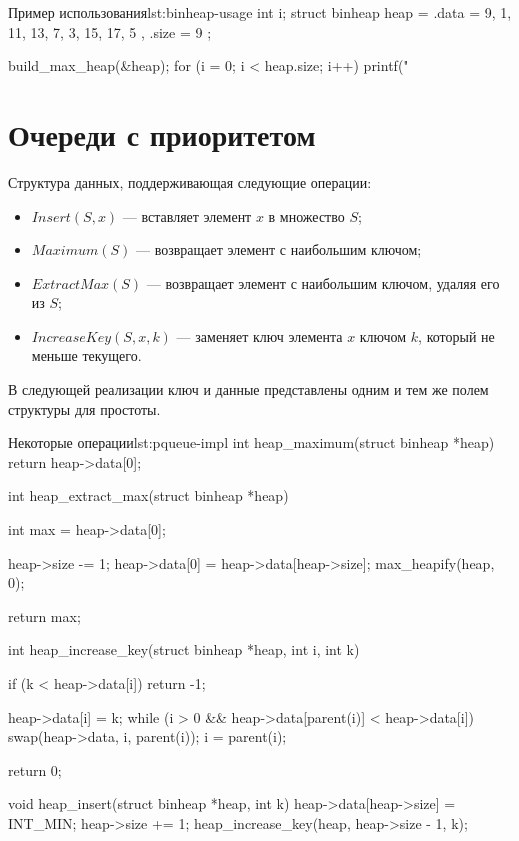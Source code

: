 \begin{clst}{Пример использования}{lst:binheap-usage}
int i;
struct binheap heap = {
    .data = { 9, 1, 11, 13, 7, 3, 15, 17, 5 },
    .size = 9
};

build_max_heap(&heap);
for (i = 0; i < heap.size; i++)
    printf("%
\end{clst}

\section{Очереди с приоритетом}
\label{sec:priority-queues}

Структура данных, поддерживающая следующие операции:
\begin{itemize}
  \item $Insert(S, x)$ --- вставляет элемент $x$ в множество $S$;
  \item $Maximum(S)$ --- возвращает элемент с наибольшим ключом;
  \item $ExtractMax(S)$ --- возвращает элемент с наибольшим ключом, удаляя его из $S$;
  \item $IncreaseKey(S, x, k)$ --- заменяет ключ элемента $x$ ключом $k$, который не меньше текущего.
\end{itemize}

В следующей реализации ключ и данные представлены одним и тем же полем структуры для простоты.

\begin{clst}{Некоторые операции}{lst:pqueue-impl}
int heap_maximum(struct binheap *heap)
{
    return heap->data[0];
}

int heap_extract_max(struct binheap *heap)
{
    int max = heap->data[0];

    heap->size -= 1;
    heap->data[0] = heap->data[heap->size];
    max_heapify(heap, 0);

    return max;
}


int heap_increase_key(struct binheap *heap, int i, int k)
{
    if (k < heap->data[i])
        return -1;

    heap->data[i] = k;
    while (i > 0 && heap->data[parent(i)] < heap->data[i]) {
        swap(heap->data, i, parent(i));
        i = parent(i);
    }

    return 0;
}

void heap_insert(struct binheap *heap, int k)
{
    heap->data[heap->size] = INT_MIN;
    heap->size += 1;
    heap_increase_key(heap, heap->size - 1, k);
}
\end{clst}

